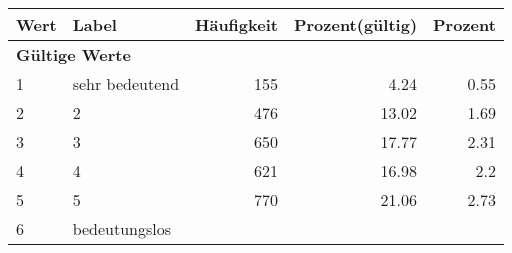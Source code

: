      \begin{longtable}{lXrrr}
     \toprule
     \textbf{Wert} & \textbf{Label} & \textbf{Häufigkeit} & \textbf{Prozent(gültig)} & \textbf{Prozent} \\
     \endhead
     \midrule
     \multicolumn{5}{l}{\textbf{Gültige Werte}}\\

     1 &
     \multicolumn{1}{X}{ sehr bedeutend   } &


       \num{155} &
       \num[round-mode=places,round-precision=2]{4.24} &
         \num[round-mode=places,round-precision=2]{0.55} \\

     2 &
     \multicolumn{1}{X}{ 2   } &


       \num{476} &
       \num[round-mode=places,round-precision=2]{13.02} &
         \num[round-mode=places,round-precision=2]{1.69} \\

     3 &
     \multicolumn{1}{X}{ 3   } &


       \num{650} &
       \num[round-mode=places,round-precision=2]{17.77} &
         \num[round-mode=places,round-precision=2]{2.31} \\

     4 &
     \multicolumn{1}{X}{ 4   } &


       \num{621} &
       \num[round-mode=places,round-precision=2]{16.98} &
         \num[round-mode=places,round-precision=2]{2.2} \\

     5 &
     \multicolumn{1}{X}{ 5   } &


       \num{770} &
       \num[round-mode=places,round-precision=2]{21.06} &
         \num[round-mode=places,round-precision=2]{2.73} \\

     6 &
     \multicolumn{1}{X}{ bedeutungslos   } &



\end{longtable}
